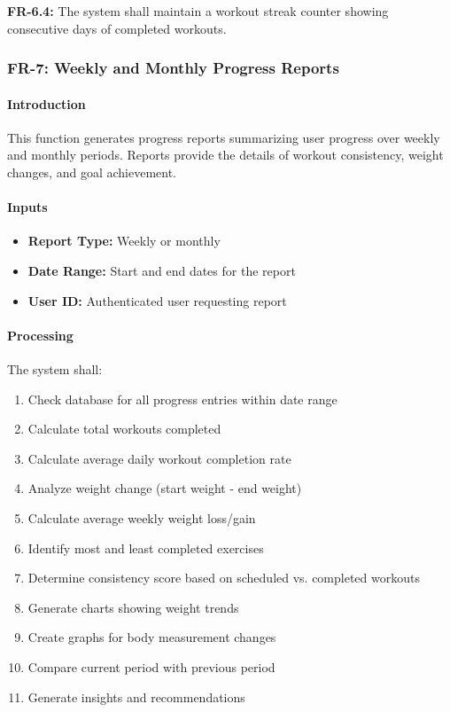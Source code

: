 \documentclass[12pt,a4paper]{article}
\begin{document}
\textbf{FR-6.4:} The system shall maintain a workout streak counter showing consecutive days of completed workouts.

\subsubsection{FR-7: Weekly and Monthly Progress Reports}

\paragraph{Introduction}
This function generates progress reports summarizing user progress over weekly and monthly periods. Reports provide the details of workout consistency, weight changes, and goal achievement.

\paragraph{Inputs}
\begin{itemize}
    \item \textbf{Report Type:} Weekly or monthly
    \item \textbf{Date Range:} Start and end dates for the report
    \item \textbf{User ID:} Authenticated user requesting report
\end{itemize}

\paragraph{Processing}
The system shall:
\begin{enumerate}
    \item Check database for all progress entries within date range
    \item Calculate total workouts completed
    \item Calculate average daily workout completion rate
    \item Analyze weight change (start weight - end weight)
    \item Calculate average weekly weight loss/gain
    \item Identify most and least completed exercises
    \item Determine consistency score based on scheduled vs. completed workouts
    \item Generate charts showing weight trends
    \item Create graphs for body measurement changes
    \item Compare current period with previous period
    \item Generate insights and recommendations
\end{enumerate}
\end{document}
